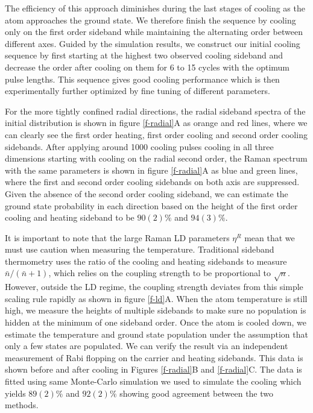 \documentclass[aps,prl,twocolumn,groupedaddress]{revtex4-1}
\begin{document}
The efficiency of this approach diminishes during the last stages of cooling as the atom approaches the ground state.  We therefore finish the sequence by cooling only on the first order sideband while maintaining the alternating order between different axes.
Guided by the simulation results, we construct our initial cooling sequence by first starting
at the highest two observed cooling sideband and decrease the order after cooling on them
for 6 to 15 cycles with the optimum pulse lengths.
This sequence gives good cooling performance which is then experimentally further optimized
by fine tuning of different parameters.

For the more tightly confined radial directions,
the radial sideband spectra of the initial distribution is shown in figure \ref{f-radial}A
as orange and red lines, where we can clearly see the first order heating,
first order cooling and second order cooling sidebands.
After applying around 1000 cooling pulses cooling in all three dimensions
starting with cooling on the radial second order,
the Raman spectrum with the same parameters is shown in figure \ref{f-radial}A as
blue and green lines, where the first and second order cooling sidebands
on both axis are suppressed.
Given the absence of the second order cooling sideband,
we can estimate the ground state probability in each direction based on the height of
the first order cooling and heating sideband to be $90(2)\%$ and $94(3)\%$.

It is important to note that the large Raman LD parameters $\eta^R$ mean that
we must use caution when measuring the temperature.
Traditional sideband thermometry uses
the ratio of the cooling and heating sidebands to measure $\bar n / (\bar n + 1)$, which relies
on the coupling strength to be proportional to $\sqrt{n}$. However, outside the
LD regime, the coupling strength deviates from this simple scaling rule rapidly as
shown in figure \ref{f-ld}A.
When the atom temperature is still high,
we measure the heights of multiple sidebands to make sure no population is hidden at the
minimum of one sideband order. Once the atom is cooled down, we estimate the temperature
and ground state population under the assumption that only a few states are populated.
We can verify the result via an independent measurement of Rabi flopping on the carrier and
heating sidebands\cite{Meekhof1996}. This data is shown before and after cooling in Figures
\ref{f-radial}B and \ref{f-radial}C.
The data is fitted using same Monte-Carlo simulation we used to simulate the cooling
which yields $89(2)\%$ and $92(2)\%$ showing good agreement between the two methods.
\end{document}
